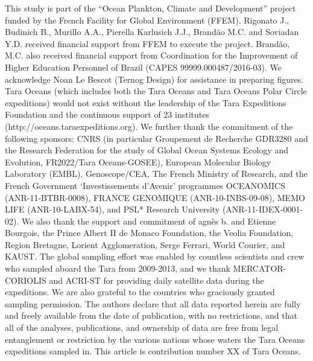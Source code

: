\documentclass[fleqn,10pt]{wlscirep}
\begin{document}
This study is part of the “Ocean Plankton, Climate and Development” project funded by the French Facility for Global Environment (FFEM). Rigonato J., Budinich B., Murillo A.A., Pierella Karlusich J.J., Brandão M.C. and Soviadan Y.D. received financial support from FFEM to execute the project. Brandão, M.C. also received financial support from Coordination for the Improvement of Higher Education Personnel of Brazil (CAPES 99999.000487/2016-03). We acknowledge Noan Le Bescot (Ternog Design) for assistance in preparing figures. Tara Oceans (which includes both the Tara Oceans and Tara Oceans Polar Circle expeditions) would not exist without the leadership of the Tara Expeditions Foundation and the continuous support of 23 institutes (http://oceans.taraexpeditions.org). We further thank the commitment of the following sponsors: CNRS (in particular Groupement de Recherche GDR3280 and the Research Federation for the study of Global Ocean Systems Ecology and Evolution, FR2022/Tara Oceans-GOSEE), European Molecular Biology Laboratory (EMBL), Genoscope/CEA, The French Ministry of Research, and the French Government ‘Investissements d’Avenir’ programmes OCEANOMICS (ANR-11-BTBR-0008), FRANCE GENOMIQUE (ANR-10-INBS-09-08), MEMO LIFE (ANR-10-LABX-54), and PSL* Research University (ANR-11-IDEX-0001-02). We also thank the support and commitment of agnès b. and Etienne Bourgois, the Prince Albert II de Monaco Foundation, the Veolia Foundation, Region Bretagne, Lorient Agglomeration, Serge Ferrari, World Courier, and KAUST. The global sampling effort was enabled by countless scientists and crew who sampled aboard the Tara from 2009-2013, and we thank MERCATOR-CORIOLIS and ACRI-ST for providing daily satellite data during the expeditions. We are also grateful to the countries who graciously granted sampling permission. The authors declare that all data reported herein are fully and freely available from the date of publication, with no restrictions, and that all of the analyses, publications, and ownership of data are free from legal entanglement or restriction by the various nations whose waters the Tara Oceans expeditions sampled in. This article is contribution number XX of Tara Oceans.


\end{document}
